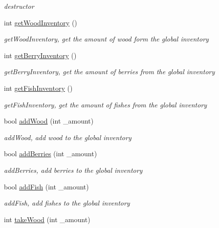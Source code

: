 \begin{DoxyCompactItemize}
\begin{DoxyCompactList}\small\item\em destructor \end{DoxyCompactList}\item 
int \hyperlink{class_inventory_ae7c976e073da5bb5dbb50ccf75b77514}{get\+Wood\+Inventory} ()
\begin{DoxyCompactList}\small\item\em get\+Wood\+Inventory, get the amount of wood form the global inventory \end{DoxyCompactList}\item 
int \hyperlink{class_inventory_a09aabe66b77e1eaeab0af7f64fc98b06}{get\+Berry\+Inventory} ()
\begin{DoxyCompactList}\small\item\em get\+Berry\+Inventory, get the amount of berries from the global inventory \end{DoxyCompactList}\item 
int \hyperlink{class_inventory_a9073255708aec050676ee9457e661e92}{get\+Fish\+Inventory} ()
\begin{DoxyCompactList}\small\item\em get\+Fish\+Inventory, get the amount of fishes from the global inventory \end{DoxyCompactList}\item 
bool \hyperlink{class_inventory_a15a3a48902555258c2b621e49a71bd35}{add\+Wood} (int \+\_\+amount)
\begin{DoxyCompactList}\small\item\em add\+Wood, add wood to the global inventory \end{DoxyCompactList}\item 
bool \hyperlink{class_inventory_a910d0cede635b76e0ceae407f47661f1}{add\+Berries} (int \+\_\+amount)
\begin{DoxyCompactList}\small\item\em add\+Berries, add berries to the global inventory \end{DoxyCompactList}\item 
bool \hyperlink{class_inventory_ac6a68a15e817c0bf293dee99d45d2096}{add\+Fish} (int \+\_\+amount)
\begin{DoxyCompactList}\small\item\em add\+Fish, add fishes to the global inventory \end{DoxyCompactList}\item 
int \hyperlink{class_inventory_aa3a1293b7a674e5c2408d492baa197c5}{take\+Wood} (int \+\_\+amount)

\end{DoxyCompactItemize}
